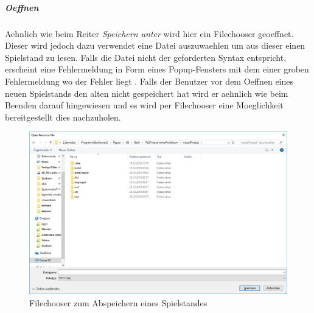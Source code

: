 \subparagraph{Oeffnen}
Aehnlich wie beim Reiter \emph{Speichern unter} wird hier ein Filechooser geoeffnet. Dieser wird jedoch dazu verwendet eine Datei auszuwaehlen um aus dieser einen Spielstand zu lesen. Falls die Datei nicht der geforderten Syntax entspricht, erscheint eine Fehlermeldung in Form eines Popup-Fensters mit dem einer groben Fehlermeldung wo der Fehler liegt . Falls der Benutzer vor dem Oeffnen eines neuen Spielstands den alten nicht gespeichert hat wird er aehnlich wie beim Beenden darauf hingewiesen und es wird per Filechooser eine Moeglichkeit bereitgestellt dies nachzuholen.

\begin{figure}
	\centering
	\includegraphics{screenshots/screenshot_Filechooser}
	\caption[Filechooser]{Filechooser zum Abspeichern eines Spielstandes}
	\label{fig:filechooser}
\end{figure}


